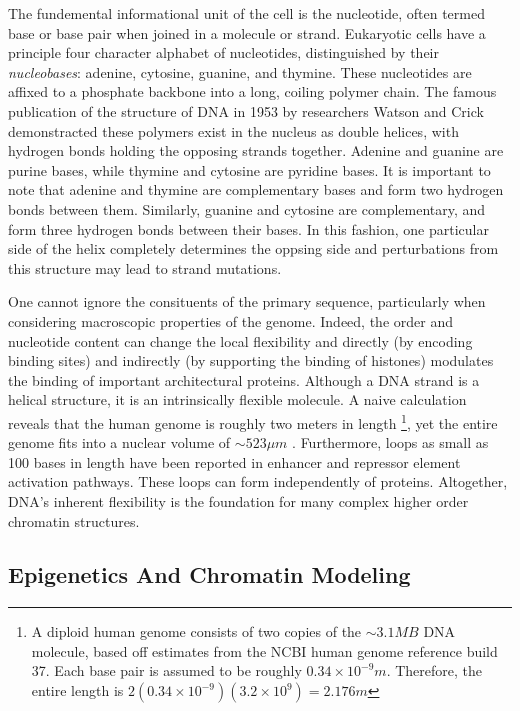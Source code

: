 \documentclass[phd,tocprelim]{cornell}
\begin{document}
The fundemental informational unit of the cell is the nucleotide, often
termed base or base pair when joined in a molecule or strand.  Eukaryotic
cells have a principle four character alphabet of nucleotides, distinguished
by their \textit{nucleobases}: adenine, cytosine, guanine, and thymine.  These
nucleotides are affixed to a phosphate backbone into a long, coiling polymer
chain.  The famous publication of the structure of DNA in 1953 by researchers
Watson and Crick demonstracted these polymers exist in the nucleus as double
helices\cite{watson1953}, with hydrogen bonds holding the opposing strands
together.  Adenine and guanine are purine bases, while thymine and cytosine are
pyridine bases.  It is important to note that adenine and thymine are
complementary bases and form two hydrogen bonds between them.  Similarly,
guanine and cytosine are complementary, and form three hydrogen bonds between
their bases.  In this fashion, one particular side of the helix completely
determines the oppsing side and perturbations from this structure may lead
to strand mutations\cite{cox2008}.

One cannot ignore the consituents of the primary sequence, particularly when
considering macroscopic properties of the genome.  Indeed, the order and
nucleotide content can change the local flexibility and directly (by
encoding binding sites) and indirectly (by supporting the binding of histones)
modulates the binding of important architectural proteins\cite{travers2004}.
Although a DNA strand is a helical structure, it is an intrinsically
flexible molecule.  A naive calculation reveals that the human genome is
roughly two meters in length%
\footnote{%
  A diploid human genome consists of two copies of the $\sim3.1MB$ DNA molecule,
  based off estimates from the NCBI human genome reference build 37.
  Each base pair is assumed to be roughly $0.34\times10^{-9}m$.  Therefore, the
  entire length is $2(0.34 \times 10^{-9})(3.2 \times 10^9) = 2.176m$
},
yet the entire genome fits into a nuclear volume of $\sim523\mu{}m$
\cite{marks2011}.  Furthermore, loops as small as 100 bases in length have been
reported in enhancer and repressor element activation pathways\cite{wong2008}.
These loops can form independently of proteins\cite{vafabakhsh2012}.  Altogether, DNA's
inherent flexibility is the foundation for  many complex higher order
chromatin structures.


\subsection{Epigenetics And Chromatin Modeling}
\end{document}
